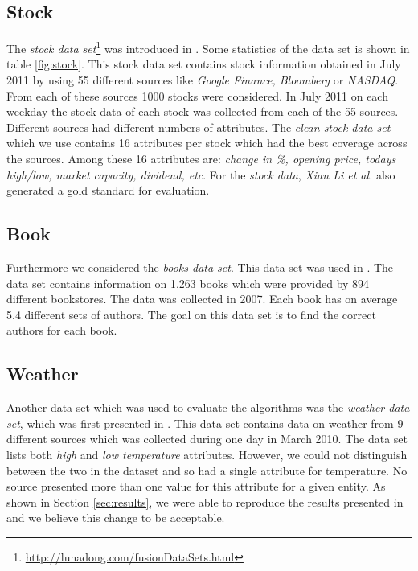 \documentclass{acm_proc_article-sp}
\begin{document}
\subsection{Stock}

The \emph{stock data set}\footnote{\url{http://lunadong.com/fusionDataSets.html}} was introduced in \cite{li:truth}. Some statistics of the data set is shown in table \ref{fig:stock}. This stock data set contains stock information obtained in July 2011 by using 55 different sources like \emph{Google Finance, Bloomberg} or \emph{NASDAQ}. From each of these sources 1000 stocks were considered. In July 2011 on each weekday the stock data of each stock was collected from each of the 55 sources. Different sources had different numbers of attributes. The \emph{clean stock data set} which we use contains 16 attributes per stock which had the best coverage across the sources. Among these 16 attributes are: \emph{change in \%, opening price, todays high/low, market capacity, dividend, etc}. For the \emph{stock data}, \emph{Xian Li et al.} \cite{li:truth} also generated a gold standard for evaluation.

\subsection{Book}

Furthermore we considered the \emph{books data set}. This data set was used in \cite{yin:truth}. The data set contains information on 1,263 books which were provided by 894 different bookstores. The data was collected in 2007. Each book has on average 5.4 different sets of authors. The goal on this data set is to find the correct authors for each book.

\subsection{Weather}

Another data set which was used to evaluate the algorithms was the \emph{weather data set}, which was first presented in \cite{li:resolving}. This data set contains data on weather from 9 different sources which was collected during one day in March 2010. The data set lists both \emph{high} and \emph{low temperature} attributes. However, we could not distinguish between the two in the dataset and so had a single attribute for temperature. No source presented more than one value for this attribute for a given entity. As shown in Section \ref{sec:results}, we were able to reproduce the results presented in \cite{li:resolving} and we believe this change to be acceptable. 
\end{document}

